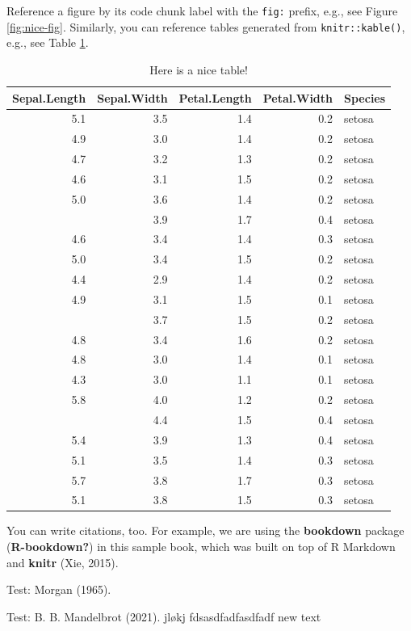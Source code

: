 \documentclass[
  12pt,
]{book}
\begin{document}
Reference a figure by its code chunk label with the \texttt{fig:} prefix, e.g., see Figure \ref{fig:nice-fig}. Similarly, you can reference tables generated from \texttt{knitr::kable()}, e.g., see Table \ref{tab:nice-tab}.

\begin{table}

\caption{\label{tab:nice-tab}Here is a nice table!}
\centering
\begin{tabular}[t]{rrrrl}
\toprule
Sepal.Length & Sepal.Width & Petal.Length & Petal.Width & Species\\
\midrule
5.1 & 3.5 & 1.4 & 0.2 & setosa\\
4.9 & 3.0 & 1.4 & 0.2 & setosa\\
4.7 & 3.2 & 1.3 & 0.2 & setosa\\
4.6 & 3.1 & 1.5 & 0.2 & setosa\\
5.0 & 3.6 & 1.4 & 0.2 & setosa\\
\addlinespace
5.4 & 3.9 & 1.7 & 0.4 & setosa\\
4.6 & 3.4 & 1.4 & 0.3 & setosa\\
5.0 & 3.4 & 1.5 & 0.2 & setosa\\
4.4 & 2.9 & 1.4 & 0.2 & setosa\\
4.9 & 3.1 & 1.5 & 0.1 & setosa\\
\addlinespace
5.4 & 3.7 & 1.5 & 0.2 & setosa\\
4.8 & 3.4 & 1.6 & 0.2 & setosa\\
4.8 & 3.0 & 1.4 & 0.1 & setosa\\
4.3 & 3.0 & 1.1 & 0.1 & setosa\\
5.8 & 4.0 & 1.2 & 0.2 & setosa\\
\addlinespace
5.7 & 4.4 & 1.5 & 0.4 & setosa\\
5.4 & 3.9 & 1.3 & 0.4 & setosa\\
5.1 & 3.5 & 1.4 & 0.3 & setosa\\
5.7 & 3.8 & 1.7 & 0.3 & setosa\\
5.1 & 3.8 & 1.5 & 0.3 & setosa\\
\bottomrule
\end{tabular}
\end{table}

You can write citations, too. For example, we are using the \textbf{bookdown} package (\textbf{R-bookdown?}) in this sample book, which was built on top of R Markdown and \textbf{knitr} (Xie, 2015).

Test: Morgan (1965).

Test: B. B. Mandelbrot (2021). jløkj fdsasdfadfasdfadf new text
\end{document}

